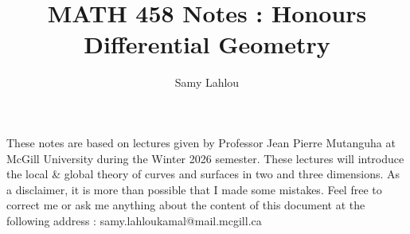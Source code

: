 \documentclass{article}
\title{MATH 458 Notes : Honours Differential Geometry}
\author{Samy Lahlou}
\date{}
\theoremstyle{definition}
\theoremstyle{definition}
\begin{document}
\maketitle


These notes are based on lectures given by Professor Jean Pierre Mutanguha at McGill University during the Winter 2026 semester. These lectures will introduce the local \& global theory of curves and surfaces in two and three dimensions. As a disclaimer, it is more than possible that I made some mistakes. Feel free to correct me or ask me anything about the content of this document at the following address : samy.lahloukamal@mail.mcgill.ca

\tableofcontents

\newpage




\newpage













\end{document}
